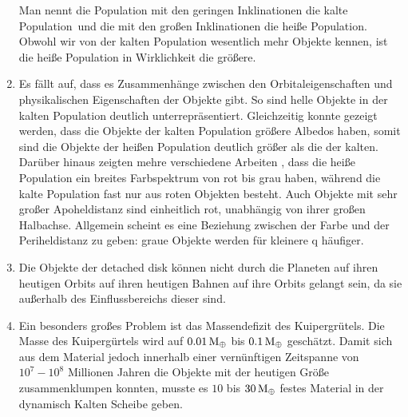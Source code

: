 \documentclass[12pt,a4paper,twoside]{article}
\renewcommand{\cite}{\citep}
\newcommand{\ME}{M_\oplus}
\begin{document}
\begin{enumerate}
Man nennt die Population mit den geringen Inklinationen die \glqq kalte Population\grqq\ und die mit den großen Inklinationen die \glqq heiße Population\grqq. Obwohl wir von der kalten Population wesentlich mehr Objekte kennen, ist die heiße Population in Wirklichkeit die größere\cite{Levison2008}.
\item Es fällt auf, dass es Zusammenhänge zwischen den Orbitaleigenschaften und physikalischen Eigenschaften der Objekte gibt. So sind helle Objekte in der kalten Population deutlich unterrepräsentiert\cite{Levison2001a}. Gleichzeitig konnte gezeigt werden, dass die Objekte der kalten Population größere Albedos haben, somit sind die Objekte der heißen Population deutlich größer als die der kalten\cite{Grundy2005}.
Darüber hinaus zeigten mehre verschiedene Arbeiten \cite{Tegler2000,Doressoundiram2001,Trujillo2002,Doressoundiram2005,Elliot2005,Levison2008}, dass die heiße Population ein breites Farbspektrum von rot bis grau haben, während die kalte Population fast nur aus roten Objekten besteht.
Auch Objekte mit sehr großer Apoheldistanz sind einheitlich rot, unabhängig von ihrer großen Halbachse.
Allgemein scheint es eine Beziehung zwischen der Farbe und der Periheldistanz zu geben: graue Objekte werden für kleinere q häufiger.
\item Die Objekte der detached disk können nicht durch die Planeten auf ihren heutigen Orbits auf ihren heutigen Bahnen auf ihre Orbits gelangt sein, da sie außerhalb des Einflussbereichs dieser sind\cite{Levison2008}.
\item Ein besonders großes Problem ist das Massendefizit des Kuipergrütels. Die Masse des Kuipergürtels wird auf $\unit[0.01]{\ME}$ bis $\unit[0.1]{\ME}$ geschätzt\cite{Gladman2001, Bernstein2004, Levison2008}.
Damit sich aus dem Material jedoch innerhalb einer vernünftigen Zeitspanne von $10^7-10^8$ Millionen Jahren die Objekte mit der heutigen Größe zusammenklumpen konnten, musste es $10$ bis $\unit[30]{\ME}$ festes Material in der dynamisch Kalten Scheibe geben.\cite{Stern1996AJ, Stern1997AJ, Stern1997ApJ, Kenyon1998AJ, Kenyon1999AJ, Kenyon1999ApJ, Kenyon2004}
\end{enumerate}
\end{document}
